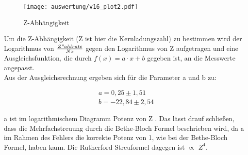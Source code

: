 \begin{figure}[H]
	\centering
	\texttt{[image: auswertung/v16\_plot2.pdf]}
	\caption{Z-Abhängigkeit}
	\label{img:grafik-dummy}
\end{figure}

Um die Z-Abhängigkeit (Z ist hier die Kernladungszahl) zu bestimmen wird der Logarithmus von $\frac{Z"ahlrate}{Nx}$ gegen den Logarithmus von Z aufgetragen und eine Ausgleichsfunktion, die durch $f(x)=a\cdot x+b$ gegeben ist, an die Messwerte angepasst. \\
Aus der Ausgleichsrechnung ergeben sich für die Parameter a und b zu:

\begin{align*}
a= 0,25 \pm 1,51
\\
b= -22,84 \pm 2,54
\end{align*}

a ist im logarithmischem Diagramm Potenz von Z . Das lässt drauf schließen, dass die Mehrfachstreuung durch die Bethe-Bloch Formel beschrieben wird, da a im Rahmen des Fehlers die korrekte Potenz von 1, wie bei der Bethe-Bloch Formel, haben kann. Die Rutherford Streuformel dagegen ist $\propto$ $Z^4$.
